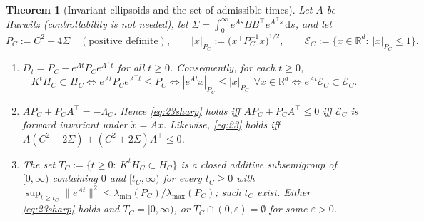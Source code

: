 \documentclass[11pt]{article}
\newtheorem{theorem}{Theorem}
\theoremstyle{definition}
\theoremstyle{remark}
\newcommand{\R}{\mathbb{R}}
\newcommand{\dd}{\,\mathrm{d}}
\newcommand{\tp}{\top}
\begin{document}
\begin{theorem}[Invariant ellipsoids and the set of admissible times]\label{thm:D}
Let $A$ be Hurwitz (controllability is not needed), let $\Sigma=\int_0^\infty e^{As}BB^\tp e^{A^\tp s}\dd s$, and let
\[
P_C:=C^2+4\Sigma\quad(\text{positive definite}),\qquad |x|_{P_C}:=\bigl(x^\tp P_C^{-1}x\bigr)^{1/2},\qquad
\mathcal E_C:=\{x\in\R^d:\ |x|_{P_C}\le1\}.
\]
\begin{enumerate}
\item[(a)] $D_t=P_C-e^{At}P_Ce^{A^\tp t}$ for all $t\ge0$. Consequently, for each $t\ge0$,
\[
K^tH_C\subset H_C\iff e^{At}P_Ce^{A^\tp t}\le P_C\iff |e^{At}x|_{P_C}\le|x|_{P_C}\ \ \forall x\in\R^d\iff e^{At}\mathcal E_C\subset\mathcal E_C .
\]
\item[(b)] $A P_C+P_CA^\tp=-\Lambda_C$. Hence \eqref{eq:23sharp} holds iff $AP_C+P_CA^\tp\le0$ iff $\mathcal E_C$ is forward
invariant under $\dot x=Ax$. Likewise, \eqref{eq:23} holds iff
$A(C^2+2\Sigma)+(C^2+2\Sigma)A^\tp\le0$.
\item[(c)] The set $T_C:=\{t\ge0:\ K^tH_C\subset H_C\}$ is a closed additive subsemigroup of $[0,\infty)$ containing
$0$ and $[t_C,\infty)$ for every $t_C\ge0$ with $\sup_{t\ge t_C}\|e^{At}\|^2\le\lambda_{\min}(P_C)/\lambda_{\max}(P_C)$;
such $t_C$ exist. Either \eqref{eq:23sharp} holds and $T_C=[0,\infty)$, or $T_C\cap(0,\varepsilon)=\emptyset$ for some
$\varepsilon>0$.
\end{enumerate}
\end{theorem}
\end{document}
